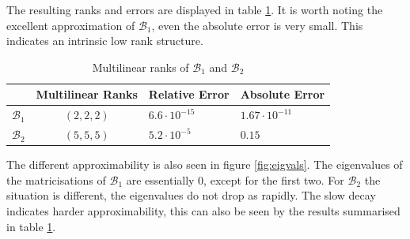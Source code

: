 \documentclass[%
a4paper,
parskip=half,
DIV=calc,
]
{scrartcl}
\begin{document}
The resulting ranks and errors are displayed in table
\ref{tab:hosvdrk}.  It is worth noting the excellent approximation of
$\mathcal{B}_1$, even the absolute error is very small.  This
indicates an intrinsic low rank structure.
\begin{table}[h]
  \centering
  \begin{tabular}[]{ccll}
    & Multilinear Ranks & Relative Error & Absolute Error \\ \hline
    $\mathcal{B}_1$ & $(2,2,2)$ & $6.6 \cdot 10^{-15}$  & $1.67 \cdot 10^{-11}$ \\
    $\mathcal{B}_2$ & $(5,5,5)$ & $5.2 \cdot 10^{- 5}$  & $0.15$ \\
  \end{tabular}
  \caption{Multilinear ranks of $\mathcal{B}_1$ and $\mathcal{B}_2$}
  \label{tab:hosvdrk}
\end{table}
The different approximability is also seen in figure
\ref{fig:eigvals}.  The eigenvalues of the matricisations of
$\mathcal{B}_1$ are essentially 0, except for the first two.  For
$\mathcal{B}_2$ the situation is different, the eigenvalues do not
drop as rapidly.  The slow decay indicates harder approximability,
this can also be seen by the results summarised in table
\ref{tab:hosvdrk}.
\end{document}
